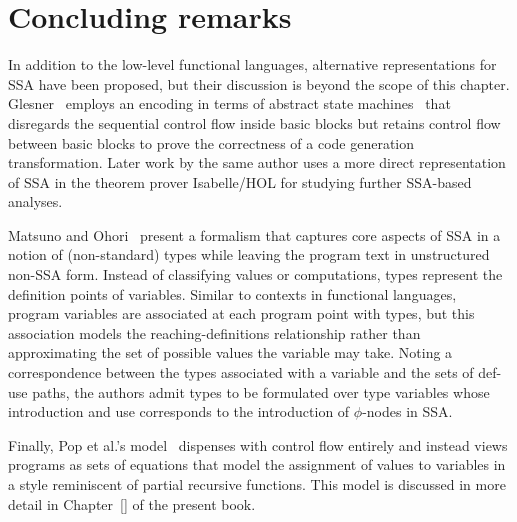 
\section{Concluding remarks}
\label{section:Part1:Semantics:Conclusion}
In addition to the low-level functional languages, alternative
representations for SSA have been proposed, but their discussion is
beyond the scope of this chapter.
Glesner~\cite{DBLP:conf/asm/Glesner04} employs an encoding in terms of
abstract state machines~\cite{DBLP:journals/tocl/Gurevich00} that
disregards the sequential control flow inside basic blocks but retains
control flow between basic blocks to prove the correctness of a code
generation transformation. Later work by the same author uses a more
direct representation of SSA in the theorem prover Isabelle/HOL for
studying further SSA-based analyses.

Matsuno and Ohori~\cite{DBLP:conf/ppdp/MatsunoO06} present a formalism
that captures core aspects of SSA in a notion of (non-standard) types
while leaving the program text in unstructured non-SSA form. Instead
of classifying values or computations, types represent the definition
points of variables.  Similar to contexts in functional languages,
program variables are associated at each program point with types, but
this association models the reaching-definitions relationship rather
than approximating the set of possible values the variable may take.
Noting a correspondence between the types associated with a variable
and the sets of def-use paths, the authors admit types to be
formulated over type variables whose introduction and use corresponds
to the introduction of $\phi$-nodes in SSA.

Finally, Pop et al.'s model~\cite{PopJS2007} dispenses with control
flow entirely and instead views programs as sets of equations that
model the assignment of values to variables in a style reminiscent of
partial recursive functions. This model is discussed in more detail in
Chapter~\ref{} of the present book.


